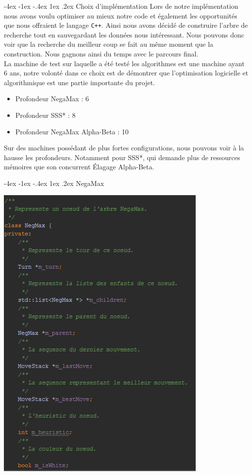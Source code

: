 \documentclass[a4paper]{article}
\makeatletter
\renewcommand{\section}{\@startsection{section}{1}{\z@}
{-4ex \@plus -1ex \@minus -.4ex}
{1ex \@plus.2ex }
{\normalfont\large\sffamily\bfseries}}
\makeatother
\begin{document}
\newpage

\section{Choix d'implémentation}
Lors de notre implémentation nous avons voulu optimiser au mieux notre code et également les opportunités que nous offraient le langage \texttt{C++}. Ainsi nous avons décidé de construire l'arbre de recherche tout en sauvegardant les données nous intéressant. Nous pouvons donc voir que la recherche du meilleur coup se fait au même moment que la construction. Nous gagnons ainsi du temps avec le parcours final.\\
La machine de test sur laquelle a été testé les algorithmes est une machine ayant 6 ans, notre volonté dans ce choix est de démontrer que l'optimisation logicielle et algorithmique est une partie importante du projet.

\begin{itemize}
\item Profondeur NegaMax            : 6
\item Profondeur SSS*               : 8
\item Profondeur NegaMax Alpha-Beta : 10
\end{itemize}

\noindent Sur des machines possédant de plus fortes configurations, nous pouvons voir à la hausse les profondeurs. Notamment pour SSS*, qui demande plus de ressources mémoires que son concurrent \'Elagage Alpha-Beta.

\section{NegaMax}
\begin{center}
\includegraphics[scale=1]{ressources/NegMax.png}
\end{center}
\end{document}
